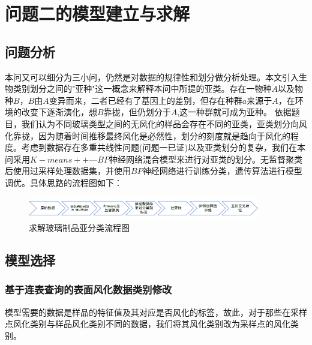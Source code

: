 \documentclass[UTF8]{ctexart}
\begin{document}
                \section{问题二的模型建立与求解}
                \subsection{问题分析}
                本问又可以细分为三小问，仍然是对数据的规律性和划分做分析处理。本文引入生物类别划分之间的"亚种"这一概念来解释本问中所提的亚类。存在一物种$A$以及物种$B$，$B$由$A$变异而来，二者已经有了基因上的差别，但存在种群$a$来源于$A$，在环境的改变下逐渐演化，想$B$靠拢，但仍划分于$A$,这一种群就可成为亚种。
                依据题目，我们认为不同玻璃类型之间的无风化的样品会存在不同的亚类，亚类划分向风化靠拢，因为随着时间推移最终风化是必然性，划分的刻度就是趋向于风化的程度。考虑到数据存在多重共线性问题(问题一已证)以及亚类划分的复杂，我们在本问采用$K-means++$—$BP$神经网络混合模型来进行对亚类的划分。无监督聚类后使用过采样处理数据集，并使用$BP$神经网络进行训练分类，遗传算法进行模型调优。具体思路的流程图如下：

                \begin{figure}[H]\centering
                    \includegraphics[width=0.9\textwidth]{img/第二问流程图.png} %
                    \caption{求解玻璃制品亚分类流程图} %
                    \label{fig:figure 6} %
                \end{figure}

                \subsection{模型选择}

                \subsubsection{基于连表查询的表面风化数据类别修改}
                模型需要的数据是样品的特征值及其对应是否风化的标签，故此，对于那些在采样点风化类别与样品风化类别不同的数据，我们将其风化类别改为采样点的风化类别。
\end{document}
